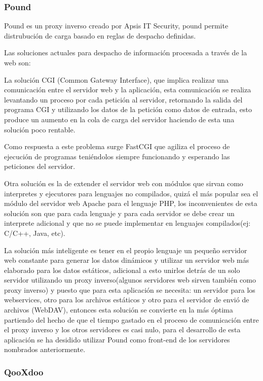 \subsubsection{Pound}
\label{tec:pound}

Pound \cite{pound} es un proxy inverso creado por Apsis IT Security, pound permite distrubución de carga basado en reglas de despacho definidas.\cite{pound}

Las soluciones actuales para despacho de información procesada a través de la web son:

La solución CGI (Common Gateway Interface), que implica realizar una comunicación entre el servidor web y la aplicación, esta comunicación se realiza levantando un proceso por cada petición al servidor, retornando la salida del programa CGI y utilizando los datos de la petición como datos de entrada, esto produce un aumento en la cola de carga del servidor haciendo de esta una solución poco rentable.

Como respuesta a este problema surge FastCGI que agiliza el proceso de ejecución de programas teniéndolos siempre funcionando y esperando las peticiones del servidor.

Otra solución es la de extender el servidor web con módulos que sirvan como interpretes y ejecutores para lenguajes no compilados, quizá el más popular sea el módulo del servidor web Apache para el lenguaje PHP, los inconvenientes de esta solución son que para cada lenguaje y para cada servidor se debe crear un interprete adicional y que no se puede implementar en lenguajes compilados(ej: C/C++, Java, etc).

La solución más inteligente es tener en el propio lenguaje un pequeño servidor web constante para generar los datos dinámicos y utilizar un servidor web más elaborado para los datos estáticos, adicional a esto unirlos detrás de un solo servidor utilizando un proxy inverso(algunos servidores web sirven también como proxy inverso) y puesto que para esta aplicación se necesita: un servidor para los webservices, otro para los archivos estáticos y otro para el servidor de envió de archivos (WebDAV), entonces esta solución se convierte en la más óptima partiendo del hecho de que el tiempo gastado en el proceso de comunicación entre el proxy inverso y los otros servidores es casi nulo, para el desarrollo de esta aplicación se ha desidido utilizar Pound como front-end de los servidores nombrados anteriormente.


\subsubsection{QooXdoo \cite{qooxdoo} }
\label{tec:qooxdoo}

